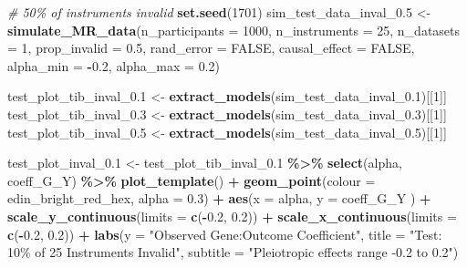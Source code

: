 \documentclass[
]{article}
\newenvironment{Shaded}{\begin{snugshade}}{\end{snugshade}}
\newcommand{\AttributeTok}[1]{\textcolor[rgb]{0.13,0.29,0.53}{#1}}
\newcommand{\CommentTok}[1]{\textcolor[rgb]{0.56,0.35,0.01}{\textit{#1}}}
\newcommand{\ConstantTok}[1]{\textcolor[rgb]{0.56,0.35,0.01}{#1}}
\newcommand{\DecValTok}[1]{\textcolor[rgb]{0.00,0.00,0.81}{#1}}
\newcommand{\FloatTok}[1]{\textcolor[rgb]{0.00,0.00,0.81}{#1}}
\newcommand{\FunctionTok}[1]{\textcolor[rgb]{0.13,0.29,0.53}{\textbf{#1}}}
\newcommand{\NormalTok}[1]{#1}
\newcommand{\OtherTok}[1]{\textcolor[rgb]{0.56,0.35,0.01}{#1}}
\newcommand{\SpecialCharTok}[1]{\textcolor[rgb]{0.81,0.36,0.00}{\textbf{#1}}}
\newcommand{\StringTok}[1]{\textcolor[rgb]{0.31,0.60,0.02}{#1}}
\begin{document}
\begin{Shaded}
\begin{Highlighting}[]
\CommentTok{\# 50\% of instruments invalid}
 \FunctionTok{set.seed}\NormalTok{(}\DecValTok{1701}\NormalTok{)}
\NormalTok{ sim\_test\_data\_inval\_0}\FloatTok{.5} \OtherTok{\textless{}{-}} \FunctionTok{simulate\_MR\_data}\NormalTok{(}\AttributeTok{n\_participants =} \DecValTok{1000}\NormalTok{,}
                                             \AttributeTok{n\_instruments =} \DecValTok{25}\NormalTok{,}
                                             \AttributeTok{n\_datasets =} \DecValTok{1}\NormalTok{,}
                                             \AttributeTok{prop\_invalid =} \FloatTok{0.5}\NormalTok{,}
                                             \AttributeTok{rand\_error =} \ConstantTok{FALSE}\NormalTok{,}
                                             \AttributeTok{causal\_effect =} \ConstantTok{FALSE}\NormalTok{,}
                                             \AttributeTok{alpha\_min =} \SpecialCharTok{{-}}\FloatTok{0.2}\NormalTok{,}
                                             \AttributeTok{alpha\_max =} \FloatTok{0.2}\NormalTok{)}


\NormalTok{ test\_plot\_tib\_inval\_0}\FloatTok{.1} \OtherTok{\textless{}{-}} \FunctionTok{extract\_models}\NormalTok{(sim\_test\_data\_inval\_0}\FloatTok{.1}\NormalTok{)[[}\DecValTok{1}\NormalTok{]]}
\NormalTok{ test\_plot\_tib\_inval\_0}\FloatTok{.3} \OtherTok{\textless{}{-}} \FunctionTok{extract\_models}\NormalTok{(sim\_test\_data\_inval\_0}\FloatTok{.3}\NormalTok{)[[}\DecValTok{1}\NormalTok{]]}
\NormalTok{ test\_plot\_tib\_inval\_0}\FloatTok{.5} \OtherTok{\textless{}{-}} \FunctionTok{extract\_models}\NormalTok{(sim\_test\_data\_inval\_0}\FloatTok{.5}\NormalTok{)[[}\DecValTok{1}\NormalTok{]]}

\NormalTok{ test\_plot\_inval\_0}\FloatTok{.1} \OtherTok{\textless{}{-}}\NormalTok{ test\_plot\_tib\_inval\_0}\FloatTok{.1} \SpecialCharTok{\%\textgreater{}\%}
   \FunctionTok{select}\NormalTok{(alpha, coeff\_G\_Y) }\SpecialCharTok{\%\textgreater{}\%}
   \FunctionTok{plot\_template}\NormalTok{() }\SpecialCharTok{+}
   \FunctionTok{geom\_point}\NormalTok{(}\AttributeTok{colour =}\NormalTok{ edin\_bright\_red\_hex, }\AttributeTok{alpha =} \FloatTok{0.3}\NormalTok{) }\SpecialCharTok{+}
   \FunctionTok{aes}\NormalTok{(}\AttributeTok{x =}\NormalTok{ alpha, }\AttributeTok{y =}\NormalTok{ coeff\_G\_Y ) }\SpecialCharTok{+}
   \FunctionTok{scale\_y\_continuous}\NormalTok{(}\AttributeTok{limits =} \FunctionTok{c}\NormalTok{(}\SpecialCharTok{{-}}\FloatTok{0.2}\NormalTok{, }\FloatTok{0.2}\NormalTok{)) }\SpecialCharTok{+}
   \FunctionTok{scale\_x\_continuous}\NormalTok{(}\AttributeTok{limits =} \FunctionTok{c}\NormalTok{(}\SpecialCharTok{{-}}\FloatTok{0.2}\NormalTok{, }\FloatTok{0.2}\NormalTok{)) }\SpecialCharTok{+}
   \FunctionTok{labs}\NormalTok{(}\AttributeTok{y =} \StringTok{"Observed Gene:Outcome Coefficient"}\NormalTok{,}
        \AttributeTok{title =} \StringTok{"Test: 10\% of 25 Instruments Invalid"}\NormalTok{,}
        \AttributeTok{subtitle =} \StringTok{"Pleiotropic effects range {-}0.2 to 0.2"}\NormalTok{)}


\end{Highlighting}
\end{Shaded}
\end{document}
